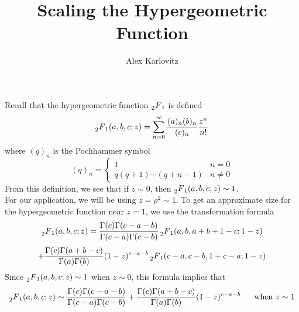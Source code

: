 \documentclass[]{article}
\title{Scaling the Hypergeometric Function}
\author{Alex Karlovitz}
\date{}
\begin{document}
	
	\maketitle

Recall that the hypergeometric function $\prescript{}{2}{F}_1$ is defined
$$
\prescript{}{2}{F}_1(a, b, c; z) = \sum_{n=0}^{\infty}\frac{(a)_n(b)_n}{(c)_n}\frac{z^n}{n!}
$$
where $(q)_n$ is the Pochhammer symbol
\[
	(q)_n =
	\begin{cases}
		1 & n = 0 \\
		q(q+1)\cdots(q+n-1) & n \neq 0
	\end{cases}
\]
From this definition, we see that if $z \sim 0$, then $\prescript{}{2}{F}_1(a, b, c; z) \sim 1$.
\\

For our application, we will be using $z = \rho^2 \sim 1$.
To get an approximate size for the hypergeometric function near $z = 1$, we use the transformation formula
$$
\prescript{}{2}{F}_1(a, b, c; z) =
\frac{\Gamma(c)\Gamma(c-a-b)}{\Gamma(c-a)\Gamma(c-b)}\prescript{}{2}{F}_1(a, b, a+b+1-c; 1-z) $$$$ + \frac{\Gamma(c)\Gamma(a+b-c)}{\Gamma(a)\Gamma(b)}(1-z)^{c-a-b}\prescript{}{2}{F}_1(c-a, c-b, 1+c-a; 1-z)
$$
Since $\prescript{}{2}{F}_1(a, b, c; z) \sim 1$ when $z \sim 0$, this formula implies that
\begin{equation}\label{zSim1}
\prescript{}{2}{F}_1(a, b, c; z) \sim
\frac{\Gamma(c)\Gamma(c-a-b)}{\Gamma(c-a)\Gamma(c-b)} +
\frac{\Gamma(c)\Gamma(a+b-c)}{\Gamma(a)\Gamma(b)}(1-z)^{c-a-b} ~~~~~\text{when}~ z \sim 1
\end{equation}
\end{document}
